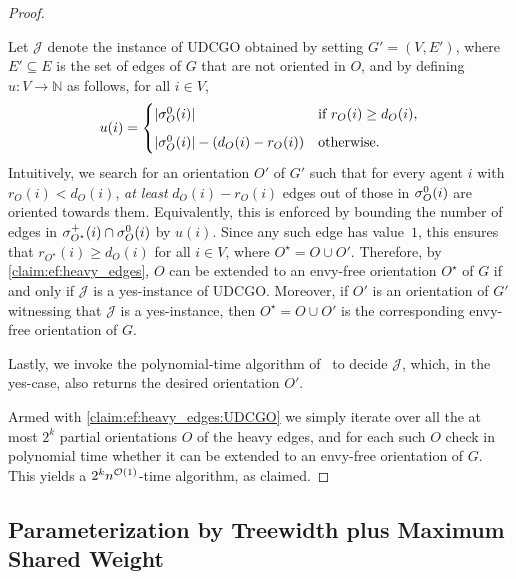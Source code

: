 \begin{proof}
\begin{nestedproof}
        Let $\mathcal{J}$ denote the instance of UDCGO obtained by setting $G' = (V, E')$,
        where $E' \subseteq E$ is the set of edges of $G$ that are not oriented in $O$,
        and by defining $u \colon V \to \mathbb{N}$ as follows, for all $i \in V$,
        \[
            u(i) =
            \begin{cases}
                |\sigma^0_O(i)|
                    & \text{if } r_O(i) \ge d_O(i),\\[2mm]
                |\sigma^0_O(i)| - (d_O(i) - r_O(i))
                    & \text{otherwise.}
            \end{cases}
        \]
        Intuitively, we search for an orientation $O'$ of $G'$ such that for every agent $i$ with $r_O(i) < d_O(i)$,
        \emph{at least} $d_O(i) - r_O(i)$ edges out of those in $\sigma^0_O(i)$ are oriented towards them.
        Equivalently, this is enforced by bounding the number of edges in $\sigma^+_{O^\star}(i) \cap \sigma^0_O(i)$ by $u(i)$.
        Since any such edge has value~$1$, this ensures that
        $r_{O^\star}(i) \ge d_O(i)$ for all $i \in V$, where $O^\star = O \cup O'$.
        Therefore, by \cref{claim:ef:heavy_edges},
        $O$ can be extended to an envy-free orientation $O^\star$ of $G$ if and only if $\mathcal{J}$ is a yes-instance of UDCGO.
        Moreover, if $O'$ is an orientation of $G'$ witnessing that $\mathcal{J}$ is a yes-instance,
        then $O^\star = O \cup O'$ is the corresponding envy-free orientation of $G$.

        Lastly, we invoke the polynomial-time algorithm of~\cite[Theorem~1]{FrankGyarfas1978} to decide $\mathcal{J}$,
        which, in the yes-case, also returns the desired orientation $O'$.
    \end{nestedproof}
    Armed with \cref{claim:ef:heavy_edges:UDCGO} we simply iterate over all the at most $2^k$ partial orientations $O$ of the heavy edges,
    and for each such $O$ check in polynomial time whether it can be extended to an envy-free orientation of $G$.
    This yields a $2^k n^{\mathcal{O}(1)}$-time algorithm, as claimed.
\end{proof}

\subsection{Parameterization by Treewidth plus Maximum Shared Weight}\label{subsec:EFo_shared_weight}

